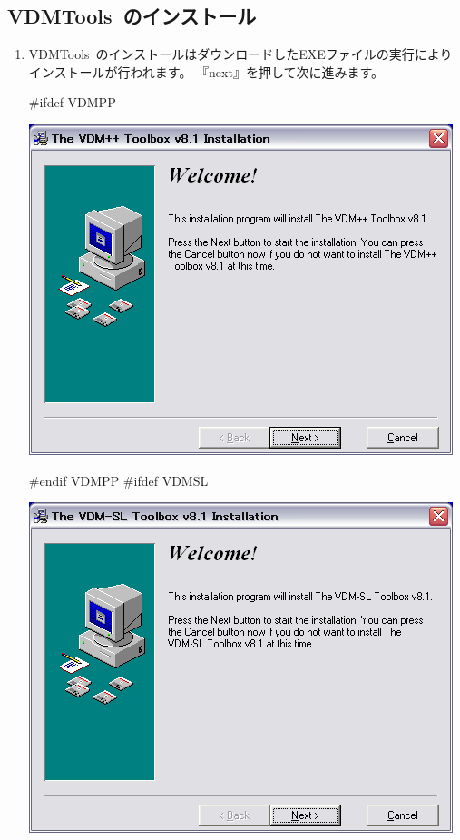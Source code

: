 \documentclass[\pformat,12pt]{jarticle}
\newcommand{\Toolbox}{VDMTools}
\newcommand{\Toolbox}{VDMTools}
\newcommand{\Toolbox}{VDMTools}
\begin{document}
\subsection{\Toolbox\ のインストール}
\begin{enumerate}
\item \Toolbox\ のインストールはダウンロードしたEXEファイルの実行によりインストールが行われます。
『next』を押して次に進みます。

#ifdef VDMPP
\begin{center}
\includegraphics[scale=0.42, bb=0 0 467 364, clip]{install_pp_start.png}
\end{center}
#endif VDMPP
#ifdef VDMSL
\begin{center}
\includegraphics[scale=0.42, bb=0 0 467 364, clip]{install_sl_start.png}

\end{center}
\end{enumerate}
\end{document}
